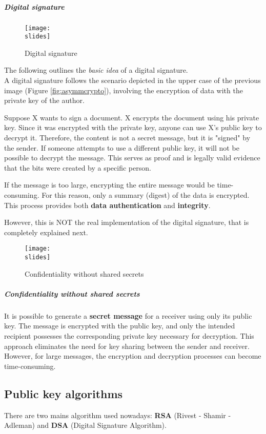 \subparagraph*{Digital signature}
\begin{figure}[h]
    \centering
    \texttt{[image: \\slides]}
    \caption{Digital signature}
\end{figure}
The following outlines the \textit{basic idea} of a digital signature.\\
A digital signature follows the scenario depicted in the upper case of the previous image (Figure \ref*{fig:asymmcrypto}),
involving the encryption of data with the private key of the author.

Suppose X wants to sign a document. X encrypts the document using his private key. Since it was encrypted with the private key, anyone can use X's public key to decrypt it. Therefore, the content is not a secret message, but it is "signed" by the sender. If someone attempts to use a different public key, it will not be possible to decrypt the message. This serves as proof and is legally valid evidence that the bits were created by a specific person.

If the message is too large, encrypting the entire message would be time-consuming. For this reason, only a summary (digest) of the data is encrypted. This process provides both \textbf{data authentication} and \textbf{integrity}.

However, this is NOT the real implementation of the digital signature, that is completely explained next. %

\begin{figure}[h]
    \centering
    \texttt{[image: \\slides]}
    \caption{Confidentiality without shared secrets}
\end{figure}

\subparagraph*{Confidentiality without shared secrets}
It is possible to generate a \textbf{secret message} for a receiver using only its public key.
The message is encrypted with the public key, and only the intended recipient possesses the corresponding private key necessary for decryption.
This approach eliminates the need for key sharing between the sender and receiver.
However, for large messages, the encryption and decryption processes can become time-consuming.

\subsection{Public key algorithms}
There are two mains algorithm used nowadays: \textbf{RSA} (Rivest - Shamir - Adleman) and \textbf{DSA} (Digital Signature
Algorithm).

